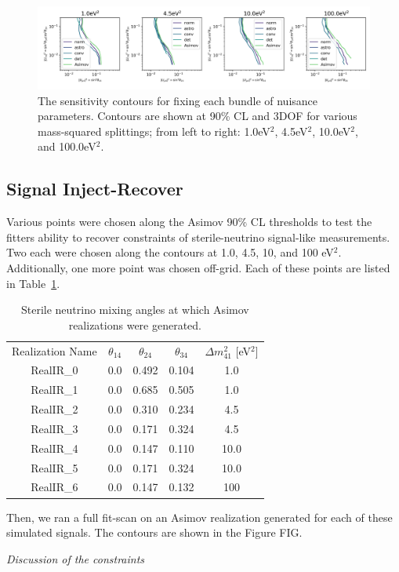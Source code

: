 \documentclass[main.tex]{subfiles}
\begin{document}
\begin{figure}
    \centering
    \includegraphics[width=0.90\linewidth]{figures/systematic_impact.png}
    \caption{The sensitivity contours for fixing each bundle of nuisance parameters. Contours are shown at 90\% CL and 3DOF for various mass-squared splittings; from left to right: 1.0eV$^{2}$, 4.5eV$^{2}$, 10.0eV$^{2}$, and 100.0eV$^{2}$.}\label{fig:impact}
\end{figure}

\subsection{Signal Inject-Recover}

Various points were chosen along the Asimov 90\% CL thresholds to test the fitters ability to recover constraints of sterile-neutrino signal-like measurements. 
Two each were chosen along the contours at 1.0, 4.5, 10, and 100 eV$^{2}$. 
Additionally, one more point was chosen off-grid. 
Each of these points are listed in Table~\ref{table:injected_signals}.

\begin{table}
    \centering
    \begin{tabular}{c | cccc}\rowcolor{blue!25}
            Realization Name & $\theta_{14}$ & $\theta_{24}$ & $\theta_{34}$ & $\Delta m_{41}^{2}$ [eV$^{2}$] \\
            RealIR\_0 & 0.0 & 0.492 & 0.104 & 1.0 \\
            RealIR\_1 & 0.0 & 0.685 & 0.505 & 1.0 \\
            RealIR\_2 & 0.0 & 0.310 & 0.234 & 4.5 \\
            RealIR\_3 & 0.0 & 0.171 & 0.324 & 4.5 \\
            RealIR\_4 & 0.0 & 0.147 & 0.110 & 10.0 \\
            RealIR\_5 & 0.0 & 0.171 & 0.324 & 10.0 \\
            RealIR\_6 & 0.0 & 0.147 & 0.132 & 100 
    \end{tabular}
    \caption{Sterile neutrino mixing angles at which Asimov realizations were generated.}\label{table:injected_signals}
\end{table}

Then, we ran a full fit-scan on an Asimov realization generated for each of these simulated signals. 
The contours are shown in the Figure FIG. 


\textit{Discussion of the constraints}
\end{document}
